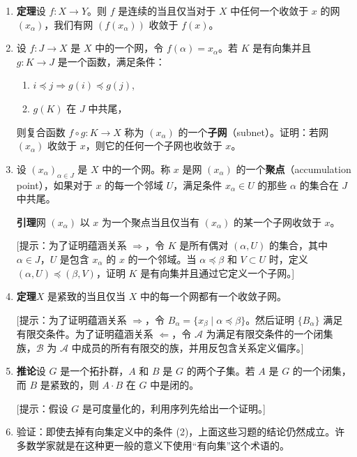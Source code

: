 \begin{enumerate}
\item \textbf{定理}\quad 设 $f\colon X\to Y$。则 $f$ 是连续的当且仅当对于 $X$ 中任何一个收敛于 $x$ 的网 $(x_{\alpha})$，我们有网 $(f(x_{\alpha}))$ 收敛于 $f(x)$。
\item 设 $f\colon J\to X$ 是 $X$ 中的一个网，令 $f(\alpha)=x_{\alpha}$。若 $K$ 是有向集并且 $g\colon K\to J$ 是一个函数，满足条件：
\begin{enumerate}
\item $i\preceq j\Longrightarrow g(i)\preceq g(j)$,
\item $g(K)$ 在 $J$ 中共尾，
\end{enumerate}
则复合函数 $f\circ g\colon K\to X$ 称为 $(x_{\alpha})$ 的一个\textbf{子网}（subnet）。证明：若网 $(x_{\alpha})$ 收敛于 $x$，则它的任何一个子网也收敛于 $x$。
\item 设 $(x_{\alpha})_{\alpha\in J}$ 是 $X$ 中的一个网。称 $x$ 是网 $(x_{\alpha})$ 的一个\textbf{聚点}（accumulation point），如果对于 $x$ 的每一个邻域 $U$，满足条件 $x_{\alpha}\in U$ 的那些 $\alpha$ 的集合在 $J$ 中共尾。

\textbf{引理}\quad 网 $(x_{\alpha})$ 以 $x$ 为一个聚点当且仅当有 $(x_{\alpha})$ 的某一个子网收敛于 $x$。

[提示：为了证明蕴涵关系 $\Rightarrow$，令 $K$ 是所有偶对 $(\alpha,U)$ 的集合，其中 $\alpha\in J$，$U$ 是包含 $x_{\alpha}$ 的 $x$ 的一个邻域。当 $\alpha\preceq\beta$ 和 $V\subset U$ 时，定义 $(\alpha,U)\preceq(\beta,V)$，证明 $K$ 是有向集并且通过它定义一个子网。]
\item \textbf{定理}\quad $X$ 是紧致的当且仅当 $X$ 中的每一个网都有一个收敛子网。

[提示：为了证明蕴涵关系 $\Rightarrow$，令 $B_{\alpha}=\{x_{\beta}\mid\alpha\preceq\beta\}$。然后证明 $\{B_{\alpha}\}$ 满足有限交条件。为了证明蕴涵关系 $\Leftarrow$，令 $\mathcal{A}$ 为满足有限交条件的一个闭集族，$\mathcal{B}$ 为 $\mathcal{A}$ 中成员的所有有限交的族，并用反包含关系定义偏序。]
\item \textbf{推论}\quad 设 $G$ 是一个拓扑群，$A$ 和 $B$ 是 $G$ 的两个子集。若 $A$ 是 $G$ 的一个闭集，而 $B$ 是紧致的，则 $A\cdot B$ 在 $G$ 中是闭的。

[提示：假设 $G$ 是可度量化的，利用序列先给出一个证明。]
\item 验证：即使去掉有向集定义中的条件 (2)，上面这些习题的结论仍然成立。许多数学家就是在这种更一般的意义下使用``有向集''这个术语的。
\end{enumerate}